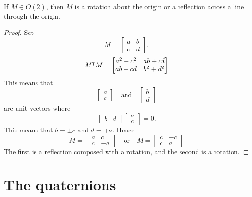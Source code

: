 \documentclass{ximera}
\begin{document}
\begin{theorem}
  If $M\in O(2)$, then $M$ is a rotation about the origin or a
  reflection across a line through the origin.
  \begin{proof}
    Set
    \[
    M= \begin{bmatrix}
      a & b \\
      c & d
    \end{bmatrix}.
    \]
    \[
    M^\intercal M =
    \begin{bmatrix}
      a^2+c^2 & ab+cd\\
      ab + cd & b^2+d^2
    \end{bmatrix}
    \]
    This means that
    \[
    \begin{bmatrix}
      a\\
      c
    \end{bmatrix}
    \quad\text{and}\quad
    \begin{bmatrix}
      b\\
      d
    \end{bmatrix}
    \]
    are unit vectors where
    \[
    \begin{bmatrix}
      b & d
    \end{bmatrix}
    \begin{bmatrix}
      a\\
      c
    \end{bmatrix}=0.    
    \]
    This means that $b= \pm c$ and $d = \mp a$. Hence
    \[
    M = \begin{bmatrix}
      a & c \\
      c & -a
    \end{bmatrix}
    \quad\text{or}\quad
    M = \begin{bmatrix}
      a & -c \\
      c & a
    \end{bmatrix}
    \]
    The first is a reflection composed with a rotation, and the second
    is a rotation.
  \end{proof}
\end{theorem}


\section{The quaternions}
\end{document}
